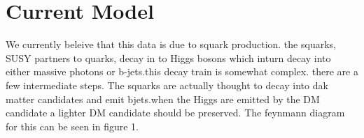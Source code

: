 \documentclass[twocolumn,aps,prd,reprint]{revtex4-1}
\begin{document}
\section{Current Model}
We currently beleive that this data is due to squark production. the squarks, SUSY partners to quarks, decay in to Higgs bosons which inturn decay into either massive photons or b-jets.this decay train is somewhat complex. there are a few intermediate steps. The squarks are actually thought to decay into dak matter candidates and emit bjets.when the Higgs are emitted by the DM candidate a lighter DM candidate should be preserved. The feynmann diagram for this can be seen in figure 1.  
 
\end{document}
